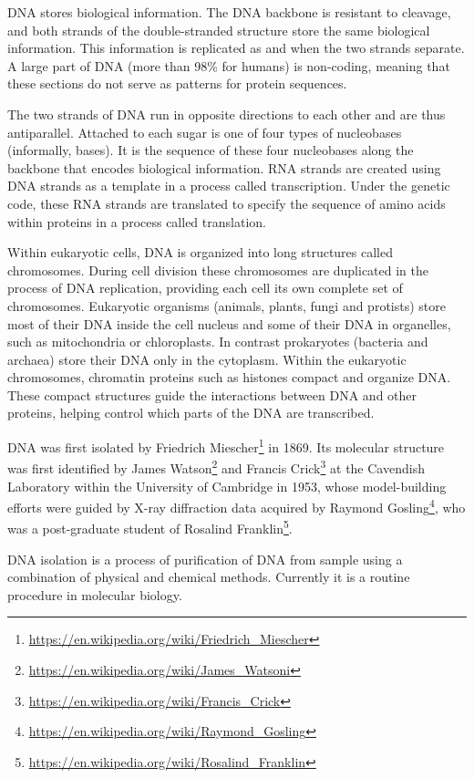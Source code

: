 \documentclass[]{book}
\let\rmarkdownfootnote\footnote%
\def\footnote{\protect\rmarkdownfootnote}
\renewcommand{\href}[2]{#2\footnote{\url{#1}}}
\begin{document}
DNA stores biological information. The DNA backbone is resistant to
cleavage, and both strands of the double-stranded structure store the
same biological information. This information is replicated as and when
the two strands separate. A large part of DNA (more than 98\% for
humans) is non-coding, meaning that these sections do not serve as
patterns for protein sequences.

The two strands of DNA run in opposite directions to each other and are
thus antiparallel. Attached to each sugar is one of four types of
nucleobases (informally, bases). It is the sequence of these four
nucleobases along the backbone that encodes biological information. RNA
strands are created using DNA strands as a template in a process called
transcription. Under the genetic code, these RNA strands are translated
to specify the sequence of amino acids within proteins in a process
called translation.

Within eukaryotic cells, DNA is organized into long structures called
chromosomes. During cell division these chromosomes are duplicated in
the process of DNA replication, providing each cell its own complete set
of chromosomes. Eukaryotic organisms (animals, plants, fungi and
protists) store most of their DNA inside the cell nucleus and some of
their DNA in organelles, such as mitochondria or chloroplasts. In
contrast prokaryotes (bacteria and archaea) store their DNA only in the
cytoplasm. Within the eukaryotic chromosomes, chromatin proteins such as
histones compact and organize DNA. These compact structures guide the
interactions between DNA and other proteins, helping control which parts
of the DNA are transcribed.

DNA was first isolated by
\href{https://en.wikipedia.org/wiki/Friedrich_Miescher}{Friedrich
Miescher} in 1869. Its molecular structure was first identified by
\href{https://en.wikipedia.org/wiki/James_Watsoni}{James Watson} and
\href{https://en.wikipedia.org/wiki/Francis_Crick}{Francis Crick} at the
Cavendish Laboratory within the University of Cambridge in 1953, whose
model-building efforts were guided by X-ray diffraction data acquired by
\href{https://en.wikipedia.org/wiki/Raymond_Gosling}{Raymond Gosling},
who was a post-graduate student of
\href{https://en.wikipedia.org/wiki/Rosalind_Franklin}{Rosalind
Franklin}.

DNA isolation is a process of purification of DNA from sample using a
combination of physical and chemical methods. Currently it is a routine
procedure in molecular biology.
\end{document}
